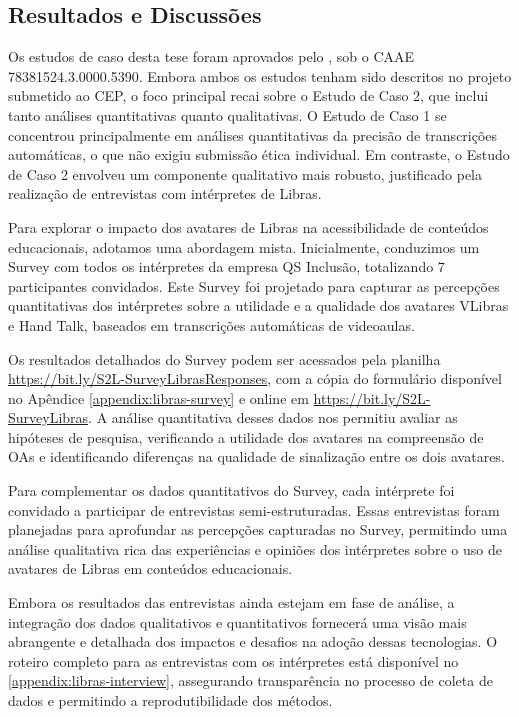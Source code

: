 \subsection{Resultados e Discussões}

Os estudos de caso desta tese foram aprovados pelo , sob o CAAE 78381524.3.0000.5390. Embora ambos os estudos tenham sido descritos no projeto submetido ao CEP, o foco principal recai sobre o Estudo de Caso 2, que inclui tanto análises quantitativas quanto qualitativas. O Estudo de Caso 1 se concentrou principalmente em análises quantitativas da precisão de transcrições automáticas, o que não exigiu submissão ética individual. Em contraste, o Estudo de Caso 2 envolveu um componente qualitativo mais robusto, justificado pela realização de entrevistas com intérpretes de Libras.

Para explorar o impacto dos avatares de Libras na acessibilidade de conteúdos educacionais, adotamos uma abordagem mista. Inicialmente, conduzimos um Survey com todos os intérpretes da empresa QS Inclusão, totalizando 7 participantes convidados. Este Survey foi projetado para capturar as percepções quantitativas dos intérpretes sobre a utilidade e a qualidade dos avatares VLibras e Hand Talk, baseados em transcrições automáticas de videoaulas.

Os resultados detalhados do Survey podem ser acessados pela planilha \url{https://bit.ly/S2L-SurveyLibrasResponses}, com a cópia do formulário disponível no Apêndice \autoref{appendix:libras-survey} e online em \url{https://bit.ly/S2L-SurveyLibras}. A análise quantitativa desses dados nos permitiu avaliar as hipóteses de pesquisa, verificando a utilidade dos avatares na compreensão de OAs e identificando diferenças na qualidade de sinalização entre os dois avatares.

Para complementar os dados quantitativos do Survey, cada intérprete foi convidado a participar de entrevistas semi-estruturadas. Essas entrevistas foram planejadas para aprofundar as percepções capturadas no Survey, permitindo uma análise qualitativa rica das experiências e opiniões dos intérpretes sobre o uso de avatares de Libras em conteúdos educacionais.

Embora os resultados das entrevistas ainda estejam em fase de análise, a integração dos dados qualitativos e quantitativos fornecerá uma visão mais abrangente e detalhada dos impactos e desafios na adoção dessas tecnologias. O roteiro completo para as entrevistas com os intérpretes está disponível no \autoref{appendix:libras-interview}, assegurando transparência no processo de coleta de dados e permitindo a reprodutibilidade dos métodos.

